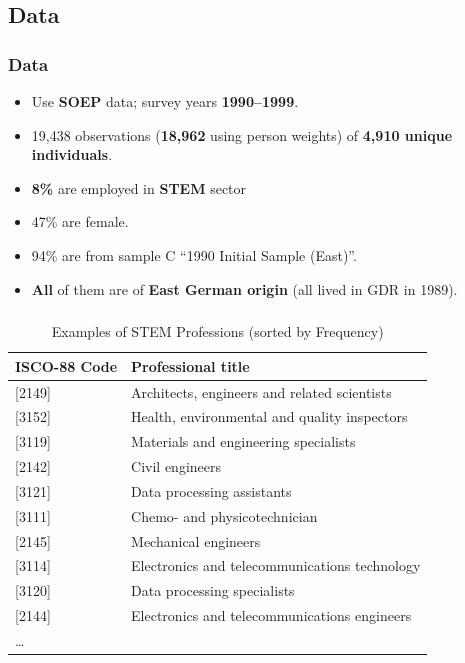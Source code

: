 \documentclass[11pt, aspectratio=1610, xcolor={dvipsnames}]{beamer}
\newcommand{\highlight}[1]{\textbf{\textcolor{PineGreen}{#1}}}
\begin{document}
	\subsection{Data}
	\begin{frame}
		\frametitle{Data}
		
		\begin{itemize}
			\item Use \highlight{SOEP} data; survey years \highlight{1990--1999}.
			\item 19,438 observations (\highlight{18,962} using person weights) of \highlight{4,910 unique individuals}.
			\item \highlight{8\%} are employed in \highlight{STEM} sector
			\item 47\% are female.
			\item 94\% are from sample C ``1990 Initial Sample (East)''.
			\item \highlight{All} of them are of \highlight{East German origin} (all lived in GDR in 1989).
		\end{itemize}
		
	\end{frame}
	
	\begin{frame}
		\frametitle{}
		
		{\linespread{1}\small
			\begin{table}[h]
				\centering
				\caption{Examples of STEM Professions (sorted by Frequency)}
				\label{tab:stem_examples}
				
				\begin{tabular}{ll}
					\toprule
					ISCO-88 Code & Professional title\\
					\midrule
					{[2149]} & Architects, engineers and related scientists\\
					{[3152]} & Health, environmental and quality inspectors\\
					{[3119]} & Materials and engineering specialists\\
					{[2142]} & Civil engineers\\
					{[3121]} & Data processing assistants\\
					{[3111]} & Chemo- and physicotechnician\\
					{[2145]} & Mechanical engineers\\
					{[3114]} & Electronics and telecommunications technology\\
					{[3120]} & Data processing specialists\\
					{[2144]} & Electronics and telecommunications engineers\\
					… &\\
					\bottomrule
				\end{tabular}
			\end{table}
		}
		
	\end{frame}
	
\end{document}
